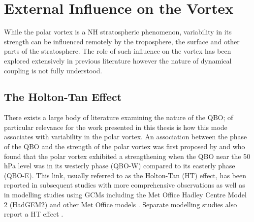 \section{External Influence on the Vortex}
While the polar vortex is a NH stratospheric phenomenon, variability in its strength can be influenced remotely by the troposphere, the surface and other parts of the stratosphere. The role of such influence on the vortex has been explored extensively in previous literature however the nature of dynamical coupling is not fully understood. 

\subsection{The Holton-Tan Effect}
There exists a large body of literature examining the nature of the QBO; of particular relevance for the work presented in this thesis is how this mode associates with variability in the polar vortex. An association between the phase of the QBO and the strength of the polar vortex was first proposed by \cite{HoltonJamesRTan1980} and \cite{Holton1982} who found that the polar vortex exhibited a strengthening when the QBO near the 50\,hPa level was in its westerly phase (QBO-W) compared to its easterly phase (QBO-E). This link, usually referred to as the Holton-Tan (HT) effect, has been reported in subsequent studies with more comprehensive observations as well as in modelling studies using GCMs including the Met Office Hadley Centre Model 2 (HadGEM2) \citep{Watson2014} and other Met Office models \citep{Garfinkel2018}. Separate modelling studies also report a HT effect \citep{Baldwin1991,Pascoe2005,Lu2008}.

